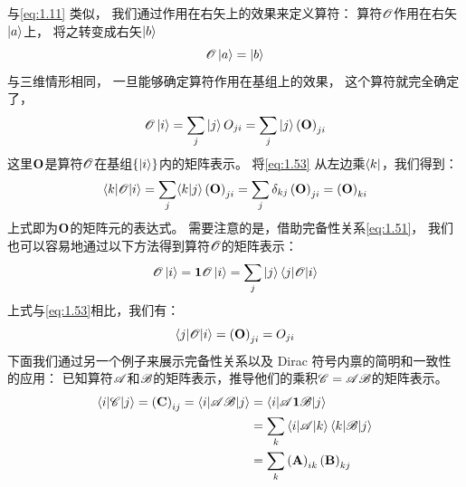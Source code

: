 与\autoref{eq:1.11} 类似，
我们通过作用在右矢上的效果来定义算符：
算符$\mathscr{O}$作用在右矢$\Ket{a}$上，
将之转变成右矢$\Ket{b}$
\begin{equation}
 \mathscr{O}\Ket{a} = \Ket{b}
 \label{eq:1.52}
\end{equation}
与三维情形相同，
一旦能够确定算符作用在基组上的效果，
这个算符就完全确定了，
\begin{equation}
 \mathscr{O}\Ket{i} = \sum_j\Ket{j}O_{ji} = \sum_j\Ket{j}\left(\mathbf{O}\right)_{ji}
 \label{eq:1.53}
\end{equation}
这里$\mathbf O$是算符$\mathscr{O}$在基组$\left\{ \Ket{i} \right\}$内的矩阵表示。
将\autoref{eq:1.53} 从左边乘$\Bra{k}$，我们得到：
\begin{equation}
 \left\langle k\middle\vert \mathscr{O} \middle\vert i\right\rangle = \sum_j\langle k \vert j \rangle\left(\mathbf O\right)_{ji} = \sum_j\delta_{kj} \left(\mathbf O\right)_{ji} = \left(\mathbf O\right)_{ki}
 \label{eq:1.54}
\end{equation}
上式即为$\mathbf O$的矩阵元的表达式。
需要注意的是，借助完备性关系\autoref{eq:1.51}，
我们也可以容易地通过以下方法得到算符$\mathscr{O}$的矩阵表示：
\begin{equation}
 \mathscr{O}\Ket{i} = {\mathbf 1}\mathscr{O}\Ket{i} = \sum_j\Ket{j}\left\langle j\middle\vert \mathscr{O} \middle\vert i\right\rangle
 \label{eq:1.55}
\end{equation}
上式与\autoref{eq:1.53}相比，我们有：
\begin{equation}
 \left\langle j\middle\vert \mathscr{O} \middle\vert i\right\rangle = \left(\mathbf O\right)_{ji} = O_{ji}
 \label{eq:1.56}
\end{equation}
下面我们通过另一个例子来展示完备性关系以及 Dirac 符号内禀的简明和一致性的应用：
已知算符$\mathscr{A}$和$\mathscr{B}$的矩阵表示，推导他们的乘积$\mathscr{C} = \mathscr{A}\mathscr{B}$的矩阵表示。
\[
\begin{split}
 \left\langle i\middle\vert \mathscr{C} \middle\vert j\right\rangle = \left(\mathbf C\right)_{ij} = \left\langle i\middle\vert \mathscr{AB} \middle\vert j\right\rangle &= \left\langle i\middle\vert\mathscr{A}\mathbf{1}\mathscr{B}\middle\vert j\right\rangle \\
 &= \sum_k \left\langle i\middle\vert \mathscr{A} \middle\vert k\right\rangle \left\langle k\middle\vert \mathscr{B} \middle\vert j\right\rangle \\
 &= \sum_k \left(\mathbf A\right)_{ik} \left(\mathbf B\right)_{kj}
\end{split}
\]

